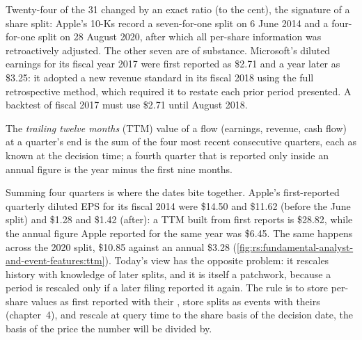 Twenty-four of the 31 changed by an exact ratio (to the cent), the signature of a share split: Apple's 10-Ks record a seven-for-one split
on 6 June 2014 and a four-for-one split on 28 August 2020, after which all per-share information was retroactively adjusted. The other
seven are  of substance. Microsoft's diluted earnings for its fiscal year 2017 were first reported as \$2.71 and a year
later as \$3.25: it adopted a new revenue standard in its fiscal 2018 using the full retrospective method, which required it to restate
each prior period presented. A backtest of fiscal 2017 must use \$2.71 until August 2018.

\begin{definition}\label{def:rs:fundamental-analyst-and-event-features:ttm}
The \emph{trailing twelve months} (TTM) value of a flow (earnings, revenue, cash flow) at a quarter's end is
the sum of the four most recent consecutive quarters, each as known at the decision time; a fourth quarter that is reported only inside
an annual figure is the year minus the first nine months.
\end{definition}

Summing four quarters is where the dates bite together. Apple's first-reported quarterly diluted EPS for its fiscal 2014 were \$14.50 and
\$11.62 (before the June split) and \$1.28 and \$1.42 (after): a TTM built from first reports is \$28.82, while the annual figure Apple
reported for the same year was \$6.45. The same happens across the 2020 split, \$10.85 against an annual \$3.28
(\cref{fig:rs:fundamental-analyst-and-event-features:ttm}). Today's view has the opposite problem: it rescales history with knowledge
of later splits, and it is itself a patchwork, because a period is rescaled only if a later filing reported it again. The rule is to
store per-share values as first reported with their , store splits as events with theirs (chapter~4), and rescale at
query time to the share basis of the decision date, the basis of the price the number will be divided by.

